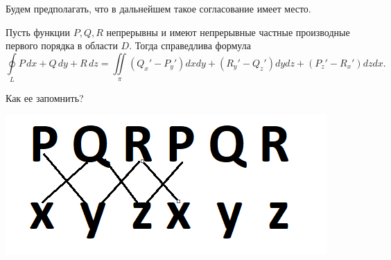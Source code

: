 \documentclass[../../main.tex]{subfiles}
\begin{document}
	Будем предполагать, что в дальнейшем такое согласование имеет место.
	
	\begin{thm}
		Пусть функции $P,Q,R$ непрерывны и имеют непрерывные частные производные первого порядка в области $D$. Тогда справедлива формула
		\[\boxed{ \oint \limits_L P \, dx + Q \, dy + R \, dz = \iint \limits_{\pi} \left( Q_x' - P_y'\right)dxdy + \left( R_y' - Q_z'\right)dydz + \left( P_z' - R_x'\right)dzdx. }\]
	\end{thm}
	
		Как ее запомнить?
		
		\begin{center}
			\includegraphics[scale = 0.6]{lec_25_PQR}
		\end{center}
		
\end{document}
